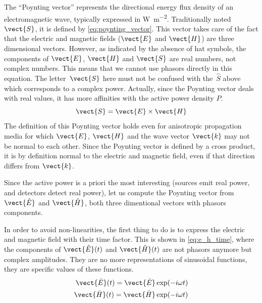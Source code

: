 The ``Poynting vector'' represents the directional energy flux density of an electromagnetic wave, typically expressed in \si{\watt\per\meter\squared}.
Traditionally noted~$\vect{S}$, it is defined by \cref{eq:poynting_vector}.
This vector takes care of the fact that the electric and magnetic fields ($\vect{E}$ and $\vect{H}$) are three dimensional vectors.
However, as indicated by the absence of hat symbols, the components of $\vect{E}$, $\vect{H}$ and $\vect{S}$ are real numbers, not complex numbers.
This means that we cannot use phasors directly in this equation.
The letter~$\vect{S}$ here must not be confused with the~$\hat{S}$ above which corresponds to a complex power.
Actually, since the Poynting vector deals with real values, it has more affinities with the active power density $P$.
\begin{equation}
    \vect{S} = \vect{E} \times \vect{H} \label{eq:poynting_vector}
\end{equation}
The definition of this Poynting vector holds even for anisotropic propagation media for which $\vect{E}$, $\vect{H}$ and the wave vector $\vect{k}$ may not be normal to each other.
Since the Poynting vector is defined by a cross product, it is by definition normal to the electric and magnetic field, even if that direction differs from $\vect{k}$.

Since the active power is a priori the most interesting (sources emit real power, and detectors detect real power), let us compute the Poynting vector from $\vect{\hat{E}}$ and $\vect{\hat{H}}$, both three dimentional vectors with phasors components.

In order to avoid non-linearities, the first thing to do is to express the electric and magnetic field with their time factor.
This is shown in \cref{eq:e_h_time}, where the components of $\vect{\hat{E}}(t)$ and $\vect{\hat{H}}(t)$ are not phasors anymore but complex amplitudes.
They are no more representations of sinusoidal functions, they are specific values of these functions.
\begin{subequations}
    \begin{align}
        \vect{\hat{E}}(t) = \vect{\hat{E}} \exp(-i \omega t) \\
        \vect{\hat{H}}(t) = \vect{\hat{H}} \exp(-i \omega t)
    \end{align}
    \label{eq:e_h_time}
\end{subequations}

